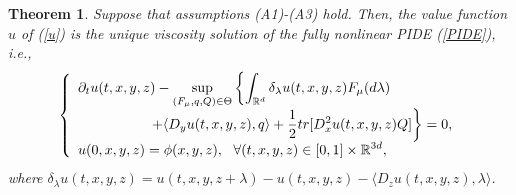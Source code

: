 \documentclass[a4paper,oneside,10pt]{article}%
\newtheorem{theorem}{Theorem}[section]
\numberwithin{equation}{section}
\begin{document}
\begin{theorem}
\label{unique viscosity theorem}Suppose that assumptions (A1)-(A3) hold. Then,
the value function $u$ of (\ref{u}) is the unique viscosity solution of the
fully nonlinear PIDE (\ref{PIDE}), i.e.,
\begin{equation}
\left \{
\begin{array}
[c]{l}%
\displaystyle \partial_{t}u(t,x,y,z)-\sup \limits_{(F_{\mu},q,Q)\in \Theta
}\left \{  \int_{\mathbb{R}^{d}}\delta_{\lambda}u(t,x,y,z)F_{\mu}%
(d\lambda)\right. \\
\displaystyle \text{\  \  \  \  \  \  \  \  \  \  \  \  \  \  \ }\left.  +\langle
D_{y}u(t,x,y,z),q\rangle+\frac{1}{2}tr[D_{x}^{2}u(t,x,y,z)Q]\right \}  =0,\\
\displaystyle u(0,x,y,z)=\phi(x,y,z),\text{ \ }\forall(t,x,y,z)\in
\lbrack0,1]\times \mathbb{R}^{3d},
\end{array}
\right.  \label{1.0}%
\end{equation}
where $\delta_{\lambda}u(t,x,y,z)=u(t,x,y,z+\lambda)-u(t,x,y,z)-\langle
D_{z}u(t,x,y,z),\lambda \rangle$.
\end{theorem}
\end{document}
